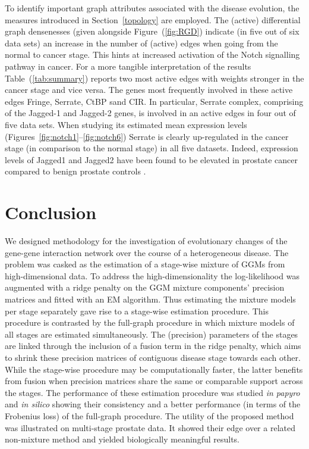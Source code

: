 \documentclass[10pt]{article}
\begin{document}
To identify important graph attributes associated with the disease evolution, the measures introduced in Section~\ref{topology} are employed. The (active) differential graph densenesses (given alongside Figure~(\ref{fig:RGD}) indicate (in five out of six data sets) an increase in the number of (active) edges when going from the normal to cancer stage. This hints at increased activation of the Notch signalling pathway in cancer. For a more tangible interpretation of the results Table~(\ref{tab:summary}) reports two most active edges with weights stronger in the cancer stage and vice versa. The genes most frequently involved in these active edges Fringe, Serrate, CtBP sand CIR. In particular, Serrate complex, comprising of the Jagged-1 and Jagged-2 genes, is involved in an active edges in four out of five data sets. When studying its estimated mean expression levels  (Figures~\ref{fig:notch1}--\ref{fig:notch6}) Serrate is clearly up-regulated in the cancer stage (in comparison to the normal stage) in all five datasets. Indeed, expression levels of Jagged1 and Jagged2 have been found to be elevated in prostate cancer compared to benign prostate controls \citep{santagata2004jagged1,carvalho2014notch}.




\section{Conclusion}
We designed methodology for the investigation of evolutionary changes of the gene-gene interaction network over the course of a heterogeneous disease. The problem was casked as the estimation of a stage-wise mixture of GGMs from high-dimensional data. To address the high-dimensionality the log-likelihood was augmented with a ridge penalty on the GGM mixture components' precision matrices and fitted with an EM algorithm. Thus estimating the mixture models per stage separately gave rise to a stage-wise estimation procedure. This procedure is contrasted by the full-graph procedure in which mixture models of all stages are estimated simultaneously. The (precision) parameters of the stages are linked through the inclusion of a fusion term in the ridge penalty, which aims to shrink these precision matrices of contiguous disease stage towards each other. While the stage-wise procedure may be computationally faster, the latter benefits from fusion when precision matrices share the same or comparable support across the stages. The performance of these estimation procedure was studied \textit{in papyro} and \textit{in silico} showing their consistency and a better performance (in terms of the Frobenius loss) of the full-graph procedure. The utility of the proposed method was illustrated on multi-stage prostate data. It showed their edge over a related non-mixture method and yielded biologically meaningful results. 
\end{document}
